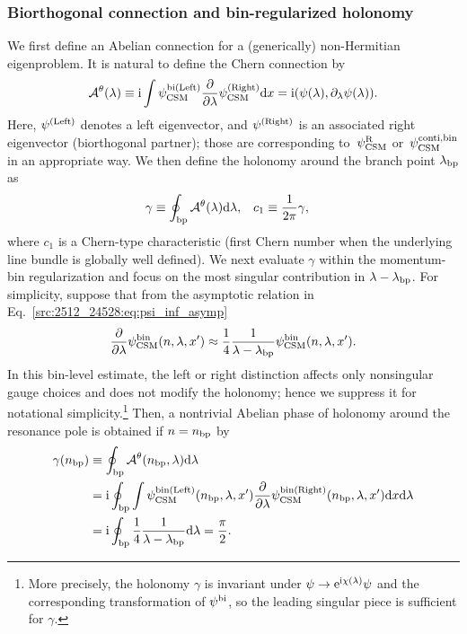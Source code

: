 \subsubsection{Biorthogonal connection and bin-regularized holonomy}
We first define an Abelian connection for a (generically) non-Hermitian eigenproblem.
It is natural to define the Chern connection by
\begin{align}
    \mathcal{A}^\theta(\lambda)
    \equiv \mathrm{i}  \int \psi^{\mathrm{bi(Left)}}_{\mathrm{CSM}} \frac{\partial}{\partial\lambda} \psi^{\mathrm{(Right)}}_{\mathrm{CSM}} \mathrm{d} x
    = \mathrm{i}  ( \psi(\lambda), \partial_\lambda \psi(\lambda)).
\end{align}
Here, $\psi^{\mathrm{(Left)}}$ denotes a left eigenvector, and $\psi^{\mathrm{(Right)}}$ is an associated right eigenvector (biorthogonal partner); those are corresponding to~$\psi^{\mathrm{R}}_{\mathrm{CSM}}$ or~$\psi^{\mathrm{conti,bin}}_{\mathrm{CSM}}$ in an appropriate way.
We then define the holonomy around the branch point $\lambda_{\mathrm{bp}}$ as
\begin{align}
    \gamma &\equiv \oint_{\mathrm{bp}} \mathcal{A}^\theta(\lambda) \mathrm{d} \lambda,
    &
    c_1 &\equiv \frac{1}{2\pi}\gamma,
    \label{src:2512_24528:eq:holonomy_chern_character}
\end{align}
where $c_1$ is a Chern-type characteristic (first Chern number when the underlying line bundle is globally well defined).
We next evaluate $\gamma$ within the momentum-bin regularization and focus on the most singular contribution in $\lambda-\lambda_{\mathrm{bp}}$.
For simplicity, suppose that from the asymptotic relation in Eq.~\eqref{src:2512_24528:eq:psi_inf_asymp}
\begin{align}
    \frac{\partial}{\partial\lambda}\psi^{\mathrm{bin}}_{\mathrm{CSM}}(n,\lambda,x')
    \approx \frac{1}{4}\frac{1}{\lambda-\lambda_{\mathrm{bp}}}\psi^{\mathrm{bin}}_{\mathrm{CSM}}(n,\lambda,x') .
\end{align}
In this bin-level estimate, the left or right distinction affects only nonsingular gauge choices and does not modify the holonomy; hence we suppress it for notational simplicity.\footnote{More precisely, the holonomy $\gamma$ is invariant under $\psi\to \mathrm{e}^{\mathrm{i} \chi(\lambda)}\psi$ and the corresponding transformation of $\psi^{\mathrm{bi}}$, so the leading singular piece is sufficient for $\gamma$.}
Then, a nontrivial Abelian phase of holonomy around the resonance pole is obtained if $n=n_{\mathrm{bp}}$ by
\begin{align}
    \gamma(n_{\mathrm{bp}}) &\equiv \oint_{\mathrm{bp}} \mathcal{A}^\theta(n_{\mathrm{bp}},\lambda) \mathrm{d} \lambda \\
    &= \mathrm{i}  \oint_{\mathrm{bp}} \int \psi^{\mathrm{bin(Left)}}_{\mathrm{CSM}}(n_{\mathrm{bp}},\lambda,x') \frac{\partial}{\partial\lambda} \psi^{\mathrm{bin(Right)}}_{\mathrm{CSM}}(n_{\mathrm{bp}},\lambda,x') \mathrm{d} x \mathrm{d} \lambda \notag\\
    &= \mathrm{i}  \oint_{\mathrm{bp}} \frac{1}{4}\frac{1}{\lambda-\lambda_{\mathrm{bp}}} \mathrm{d} \lambda
    = \frac{\pi}{2} .
\end{align}
